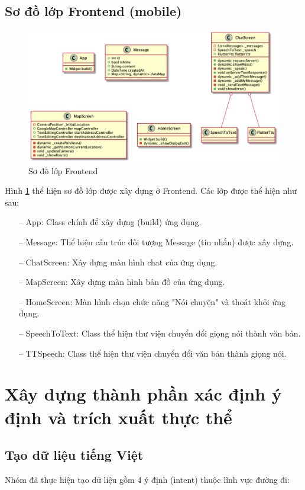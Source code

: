 \subsection{Sơ đồ lớp Frontend (mobile)}
\begin{figure}[H]
    \centering
    \includegraphics[width=15cm]{images/classdiagram.png}
    \caption{Sơ đồ lớp Frontend}
    \label{fig:classdiagram} 
\end{figure}
Hình \ref{fig:classdiagram} thể hiện sơ đồ lớp được xây dựng ở Frontend. Các lớp được thể hiện như sau:

\begin{itemize}
    \item[--] App: Class chính để xây dựng (build) ứng dụng.
    \item[--] Message: Thể hiện cấu trúc đối tượng Message (tin nhắn) được xây dựng. 
    \item[--] ChatScreen: Xây dựng màn hình chat của ứng dụng.
    \item[--] MapScreen: Xây dựng màn hình bản đồ của ứng dụng.
    \item[--] HomeScreen: Màn hình chọn chức năng "Nói chuyện" và thoát khỏi ứng dụng.
    \item[--] SpeechToText: Class thể hiện thư viện chuyển đổi giọng nói thành văn bản.  
    \item[--] TTSpeech: Class thể hiện thư viện chuyển đổi văn bản thành giọng nói.  
\end{itemize}


\section{Xây dựng thành phần xác định ý định và trích xuất thực thể}
\subsection{Tạo dữ liệu tiếng Việt}
Nhóm đã thực hiện tạo dữ liệu gồm 4 ý định (intent) thuộc lĩnh vực đường đi:


